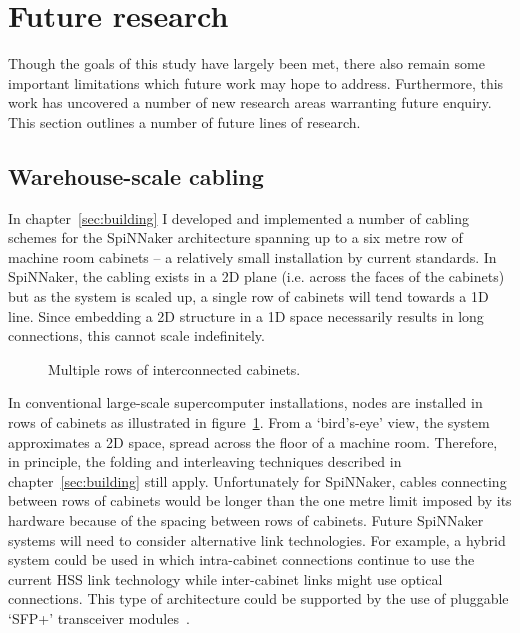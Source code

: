 	\section{Future research}
		
		Though the goals of this study have largely been met, there also remain
		some important limitations which future work may hope to address.
		Furthermore, this work has uncovered a number of new research areas
		warranting future enquiry. This section outlines a number of future lines
		of research.
		
		\subsection{Warehouse-scale cabling}
			
			In chapter~\ref{sec:building} I developed and implemented a number of
			cabling schemes for the SpiNNaker architecture spanning up to a six metre
			row of machine room cabinets -- a relatively small installation by
			current standards. In SpiNNaker, the cabling exists in a 2D plane (i.e.
			across the faces of the cabinets) but as the system is scaled up, a
			single row of cabinets will tend towards a 1D line. Since embedding a 2D
			structure in a 1D space necessarily results in long connections, this
			cannot scale indefinitely.
			
			\begin{figure}
				\center
				
				\caption{Multiple rows of interconnected cabinets.}
				\label{fig:multi-row-cabling}
			\end{figure}
			
			In conventional large-scale supercomputer installations, nodes are
			installed in rows of cabinets as illustrated in
			figure~\ref{fig:multi-row-cabling}.  From a `bird's-eye' view, the system
			approximates a 2D space, spread across the floor of a machine room.
			Therefore, in principle, the folding and interleaving techniques
			described in chapter~\ref{sec:building} still apply. Unfortunately for
			SpiNNaker, cables connecting between rows of cabinets would be longer
			than the one metre limit imposed by its hardware because of the spacing
			between rows of cabinets.  Future SpiNNaker systems will need to consider
			alternative link technologies.  For example, a hybrid system could be
			used in which intra-cabinet connections continue to use the current HSS
			link technology while inter-cabinet links might use optical connections.
			This type of architecture could be supported by the use of pluggable
			`SFP+' transceiver modules~\cite{sff01}.
		
